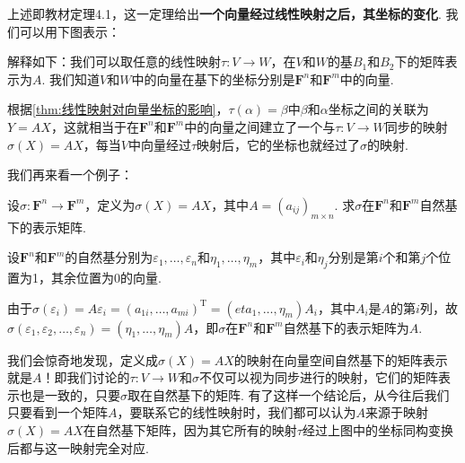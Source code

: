 上述即教材定理4.1，这一定理给出\textbf{一个向量经过线性映射之后，其坐标的变化}. 我们可以用下图表示：
\begin{figure}[htbp]
    \centering
\end{figure}

解释如下：我们可以取任意的线性映射$\tau:V\to W$，在$V$和$W$的基$B_1$和$B_2$下的矩阵表示为$A$. 我们知道$V$和$W$中的向量在基下的坐标分别是$\mathbf{F}^n$和$\mathbf{F}^m$中的向量.

根据\autoref{thm:线性映射对向量坐标的影响}，$\tau(\alpha)=\beta$中$\beta$和$\alpha$坐标之间的关联为$Y=AX$，这就相当于在$\mathbf{F}^n$和$\mathbf{F}^m$中的向量之间建立了一个与$\tau:V\to W$同步的映射$\sigma(X)=AX$，每当$V$中向量经过$\tau$映射后，它的坐标也就经过了$\sigma$的映射.

我们再来看一个例子：
\begin{example}{}{}
    设$\sigma:\mathbf{F}^n\to\mathbf{F}^m$，定义为$\sigma(X)=AX$，其中$A=(a_{ij})_{m\times n}$. 求$\sigma$在$\mathbf{F}^n$和$\mathbf{F}^m$自然基下的表示矩阵.
\end{example}

\begin{solution}
    设$\mathbf{F}^n$和$\mathbf{F}^m$的自然基分别为$\varepsilon_1,\ldots,\varepsilon_n$和$\eta_1,\ldots,\eta_m$，其中$\varepsilon_i$和$\eta_j$分别是第$i$个和第$j$个位置为1，其余位置为0的向量.

    由于$\sigma(\varepsilon_i)=A\varepsilon_i=(a_{1i},\ldots,a_{mi})^\mathrm{T}=(eta_1,\ldots,\eta_m)A_i$，其中$A_i$是$A$的第$i$列，故$\sigma(\varepsilon_1,\varepsilon_2,\ldots,\varepsilon_n)=(\eta_1,\ldots,\eta_m)A$，即$\sigma$在$\mathbf{F}^n$和$\mathbf{F}^m$自然基下的表示矩阵为$A$.
\end{solution}

我们会惊奇地发现，定义成$\sigma(X)=AX$的映射在向量空间自然基下的矩阵表示就是$A$！即我们讨论的$\tau:V\to W$和$\sigma$不仅可以视为同步进行的映射，它们的矩阵表示也是一致的，只要$\sigma$取在自然基下的矩阵. 有了这样一个结论后，从今往后我们只要看到一个矩阵$A$，要联系它的线性映射时，我们都可以认为$A$来源于映射$\sigma(X)=AX$在自然基下矩阵，因为其它所有的映射$\tau$经过上图中的坐标同构变换后都与这一映射完全对应.

